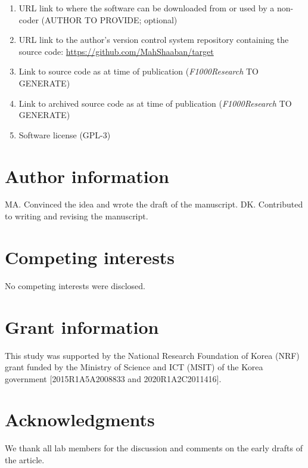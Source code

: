 \documentclass[9pt,a4paper,]{extarticle}
\begin{document}
\begin{enumerate}
\def\labelenumi{\arabic{enumi}.}
\item
  URL link to where the software can be downloaded from or used by a non-coder (AUTHOR TO PROVIDE; optional)
\item
  URL link to the author's version control system repository containing the source code: \url{https://github.com/MahShaaban/target}
\item
  Link to source code as at time of publication (\emph{F1000Research} TO GENERATE)
\item
  Link to archived source code as at time of publication (\emph{F1000Research} TO GENERATE)
\item
  Software license (GPL-3)
\end{enumerate}

\hypertarget{author-information}{%
\section{Author information}\label{author-information}}

MA. Convinced the idea and wrote the draft of the manuscript.
DK. Contributed to writing and revising the manuscript.

\hypertarget{competing-interests}{%
\section{Competing interests}\label{competing-interests}}

No competing interests were disclosed.

\hypertarget{grant-information}{%
\section{Grant information}\label{grant-information}}

This study was supported by the National Research Foundation of Korea (NRF) grant funded by the Ministry of Science and ICT (MSIT) of the Korea government {[}2015R1A5A2008833 and 2020R1A2C2011416{]}.

\hypertarget{acknowledgments}{%
\section{Acknowledgments}\label{acknowledgments}}

We thank all lab members for the discussion and comments on the early drafts of the article.

{\small}
\end{document}
